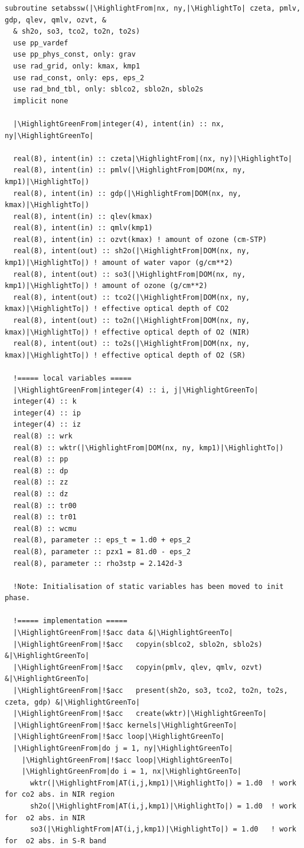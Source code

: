 \begin{lstlisting}[firstnumber=1, name=absswOpenACC, label=listing:absswOpenACC, caption={Example ASUCA kernel subroutine in OpenACC}, escapechar=|]
subroutine setabssw(|\HighlightFrom|nx, ny,|\HighlightTo| czeta, pmlv, gdp, qlev, qmlv, ozvt, &
  & sh2o, so3, tco2, to2n, to2s)
  use pp_vardef
  use pp_phys_const, only: grav
  use rad_grid, only: kmax, kmp1
  use rad_const, only: eps, eps_2
  use rad_bnd_tbl, only: sblco2, sblo2n, sblo2s
  implicit none

  |\HighlightGreenFrom|integer(4), intent(in) :: nx, ny|\HighlightGreenTo|

  real(8), intent(in) :: czeta|\HighlightFrom|(nx, ny)|\HighlightTo|
  real(8), intent(in) :: pmlv(|\HighlightFrom|DOM(nx, ny, kmp1)|\HighlightTo|)
  real(8), intent(in) :: gdp(|\HighlightFrom|DOM(nx, ny, kmax)|\HighlightTo|)
  real(8), intent(in) :: qlev(kmax)
  real(8), intent(in) :: qmlv(kmp1)
  real(8), intent(in) :: ozvt(kmax) ! amount of ozone (cm-STP)
  real(8), intent(out) :: sh2o(|\HighlightFrom|DOM(nx, ny, kmp1)|\HighlightTo|) ! amount of water vapor (g/cm**2)
  real(8), intent(out) :: so3(|\HighlightFrom|DOM(nx, ny, kmp1)|\HighlightTo|) ! amount of ozone (g/cm**2)
  real(8), intent(out) :: tco2(|\HighlightFrom|DOM(nx, ny, kmax)|\HighlightTo|) ! effective optical depth of CO2
  real(8), intent(out) :: to2n(|\HighlightFrom|DOM(nx, ny, kmax)|\HighlightTo|) ! effective optical depth of O2 (NIR)
  real(8), intent(out) :: to2s(|\HighlightFrom|DOM(nx, ny, kmax)|\HighlightTo|) ! effective optical depth of O2 (SR)

  !===== local variables =====
  |\HighlightGreenFrom|integer(4) :: i, j|\HighlightGreenTo|
  integer(4) :: k
  integer(4) :: ip
  integer(4) :: iz
  real(8) :: wrk
  real(8) :: wktr(|\HighlightFrom|DOM(nx, ny, kmp1)|\HighlightTo|)
  real(8) :: pp
  real(8) :: dp
  real(8) :: zz
  real(8) :: dz
  real(8) :: tr00
  real(8) :: tr01
  real(8) :: wcmu
  real(8), parameter :: eps_t = 1.d0 + eps_2
  real(8), parameter :: pzx1 = 81.d0 - eps_2
  real(8), parameter :: rho3stp = 2.142d-3

  !Note: Initialisation of static variables has been moved to init phase.

  !===== implementation =====
  |\HighlightGreenFrom|!$acc data &|\HighlightGreenTo|
  |\HighlightGreenFrom|!$acc   copyin(sblco2, sblo2n, sblo2s) &|\HighlightGreenTo|
  |\HighlightGreenFrom|!$acc   copyin(pmlv, qlev, qmlv, ozvt) &|\HighlightGreenTo|
  |\HighlightGreenFrom|!$acc   present(sh2o, so3, tco2, to2n, to2s, czeta, gdp) &|\HighlightGreenTo|
  |\HighlightGreenFrom|!$acc   create(wktr)|\HighlightGreenTo|
  |\HighlightGreenFrom|!$acc kernels|\HighlightGreenTo|
  |\HighlightGreenFrom|!$acc loop|\HighlightGreenTo|
  |\HighlightGreenFrom|do j = 1, ny|\HighlightGreenTo|
    |\HighlightGreenFrom|!$acc loop|\HighlightGreenTo|
    |\HighlightGreenFrom|do i = 1, nx|\HighlightGreenTo|
      wktr(|\HighlightFrom|AT(i,j,kmp1)|\HighlightTo|) = 1.d0  ! work for co2 abs. in NIR region
      sh2o(|\HighlightFrom|AT(i,j,kmp1)|\HighlightTo|) = 1.d0  ! work for  o2 abs. in NIR
      so3(|\HighlightFrom|AT(i,j,kmp1)|\HighlightTo|) = 1.d0   ! work for  o2 abs. in S-R band


\end{lstlisting}
